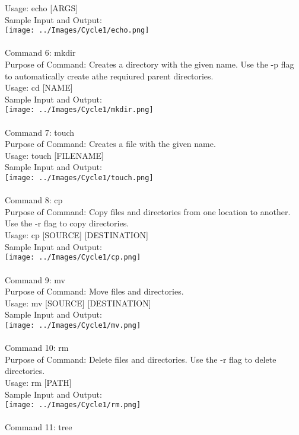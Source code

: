 \documentclass[10pt,a4paper]{report}
\begin{document}
Usage: echo [ARGS]\\
Sample Input and Output: \\
\texttt{[image: ../Images/Cycle1/echo.png]}\\
\\
Command 6: mkdir\\
Purpose of Command: Creates a directory with the given name. Use the -p flag to automatically create athe requiured parent directories.\\
Usage: cd [NAME]\\
Sample Input and Output: \\
\texttt{[image: ../Images/Cycle1/mkdir.png]}\\
\pagebreak
\\
Command 7: touch\\
Purpose of Command: Creates a file with the given name.\\
Usage: touch [FILENAME]\\
Sample Input and Output: \\
\texttt{[image: ../Images/Cycle1/touch.png]}\\
\\
Command 8: cp\\
Purpose of Command: Copy files and directories from one location to another. Use the -r flag to copy directories.\\
Usage: cp [SOURCE] [DESTINATION]\\
Sample Input and Output: \\
\texttt{[image: ../Images/Cycle1/cp.png]}\\
\\
Command 9: mv\\
Purpose of Command: Move files and directories.\\
Usage: mv [SOURCE] [DESTINATION]\\
Sample Input and Output: \\
\texttt{[image: ../Images/Cycle1/mv.png]}\\
\pagebreak
\\
Command 10: rm\\
Purpose of Command: Delete files and directories. Use the -r flag to delete directories.\\
Usage: rm [PATH]\\
Sample Input and Output: \\
\texttt{[image: ../Images/Cycle1/rm.png]}\\
\\
Command 11: tree\\
\end{document}
